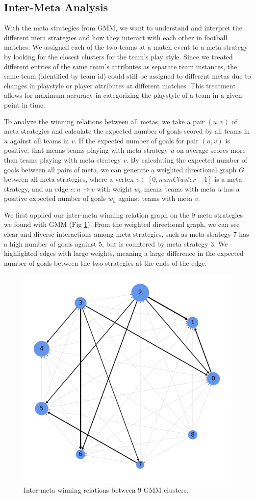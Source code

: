 \documentclass{article}
\begin{document}
\subsection{Inter-Meta Analysis}
With the meta strategies from GMM, we want to understand and interpret the different meta strategies and how they interact with each other in football matches. We assigned each of the two teams at a match event to a meta strategy by looking for the closest clusters for the team's play style. Since we treated different entries of the same team's attributes as separate team instances, the same team (identified by team id) could still be assigned to different metas due to changes in playstyle or player attributes at different matches. This treatment allows for maximum accuracy in categorizing the playstyle of a team in a given point in time.

To analyze the winning relations between all metas, we take a pair $(u,v)$ of meta strategies and calculate the expected number of goals scored by all teams in $u$ against all teams in $v$. If the expected number of goals for pair $(u,v)$ is positive, that means teams playing with meta strategy $u$ on average scores more than teams playing with meta strategy $v$. By calculating the expected number of goals between all pairs of meta, we can generate a weighted directional graph $G$ between all meta strategies, where a vertex $v\in[0,numCluster-1]$ is a meta strategy, and an edge $e:u\rightarrow v$ with weight $w_e$ means teams with meta $u$ has a positive expected number of goals $w_u$ against teams with meta $v$.

We first applied our inter-meta winning relation graph on the 9 meta strategies we found with GMM (Fig \ref{fig:gmm9}). From the weighted directional graph, we can see clear and diverse interactions among meta strategies, such as meta strategy 7 has a high number of goals against 5, but is countered by meta strategy 3. We highlighted edges with large weights, meaning a large difference in the expected number of goals between the two strategies at the ends of the edge.

\begin{figure}[H]
\centering
\includegraphics[width=.5\textwidth]{gmm9.png}
\caption{Inter-meta winning relations between 9 GMM clusters.}
\label{fig:gmm9}
\end{figure}
\end{document}
